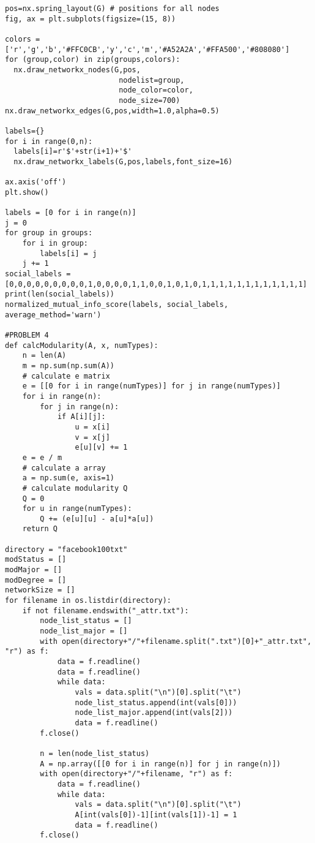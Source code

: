\documentclass[12pt,letterpaper]{article}
\begin{document}
\begin{lstlisting}[style = Python]
pos=nx.spring_layout(G) # positions for all nodes
fig, ax = plt.subplots(figsize=(15, 8))

colors = ['r','g','b','#FFC0CB','y','c','m','#A52A2A','#FFA500','#808080']
for (group,color) in zip(groups,colors):
  nx.draw_networkx_nodes(G,pos,
                          nodelist=group,
                          node_color=color,
                          node_size=700)
nx.draw_networkx_edges(G,pos,width=1.0,alpha=0.5)

labels={}
for i in range(0,n):
  labels[i]=r'$'+str(i+1)+'$'
  nx.draw_networkx_labels(G,pos,labels,font_size=16)

ax.axis('off')
plt.show()

labels = [0 for i in range(n)]
j = 0
for group in groups:
    for i in group:
        labels[i] = j
    j += 1
social_labels = [0,0,0,0,0,0,0,0,0,1,0,0,0,0,1,1,0,0,1,0,1,0,1,1,1,1,1,1,1,1,1,1,1,1]
print(len(social_labels))
normalized_mutual_info_score(labels, social_labels, average_method='warn')

#PROBLEM 4
def calcModularity(A, x, numTypes):
    n = len(A)
    m = np.sum(np.sum(A))
    # calculate e matrix
    e = [[0 for i in range(numTypes)] for j in range(numTypes)]
    for i in range(n):
        for j in range(n):
            if A[i][j]:
                u = x[i]
                v = x[j]
                e[u][v] += 1
    e = e / m
    # calculate a array
    a = np.sum(e, axis=1)
    # calculate modularity Q
    Q = 0
    for u in range(numTypes):
        Q += (e[u][u] - a[u]*a[u])
    return Q

directory = "facebook100txt"
modStatus = []
modMajor = []
modDegree = []
networkSize = []
for filename in os.listdir(directory):
    if not filename.endswith("_attr.txt"):
        node_list_status = []
        node_list_major = []
        with open(directory+"/"+filename.split(".txt")[0]+"_attr.txt", "r") as f:
            data = f.readline()
            data = f.readline()
            while data:
                vals = data.split("\n")[0].split("\t")
                node_list_status.append(int(vals[0]))
                node_list_major.append(int(vals[2]))
                data = f.readline()
        f.close()

        n = len(node_list_status)
        A = np.array([[0 for i in range(n)] for j in range(n)])
        with open(directory+"/"+filename, "r") as f:
            data = f.readline()
            while data:
                vals = data.split("\n")[0].split("\t")
                A[int(vals[0])-1][int(vals[1])-1] = 1
                data = f.readline()
        f.close()


\end{lstlisting}
\end{document}
